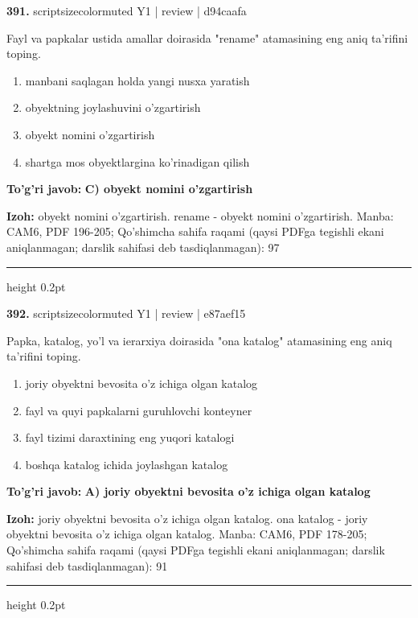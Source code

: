 \documentclass[10pt,a4paper]{article}
\begin{document}
{\bfseries\sffamily\color{ink} 391.} {scriptsizecolor{muted} Y1 | review | d94caafa}
\par
Fayl va papkalar ustida amallar doirasida "rename" atamasining eng aniq ta'rifini toping.
\begin{enumerate}[label=\Alph*),leftmargin=9mm]
\item manbani saqlagan holda yangi nusxa yaratish
\item obyektning joylashuvini o'zgartirish
\item obyekt nomini o'zgartirish
\item shartga mos obyektlargina ko'rinadigan qilish
\end{enumerate}
\begin{tcolorbox}[enhanced,breakable,colback=teal!4,colframe=teal!60!black,boxrule=0.45pt,arc=1.2mm,left=2.7mm,right=2.7mm,top=1.8mm,bottom=1.8mm,before skip=2mm,after skip=2mm]
{\bfseries\sffamily\color{teal}To'g'ri javob:} \textbf{C) obyekt nomini o'zgartirish}
\par\smallskip
{\bfseries Izoh:} obyekt nomini o'zgartirish. rename - obyekt nomini o'zgartirish. Manba: CAM6, PDF 196-205; Qo'shimcha sahifa raqami (qaysi PDFga tegishli ekani aniqlanmagan; darslik sahifasi deb tasdiqlanmagan): 97
\end{tcolorbox}
\vspace{2mm}\hrule height 0.2pt\vspace{3mm}

{\bfseries\sffamily\color{ink} 392.} {scriptsizecolor{muted} Y1 | review | e87aef15}
\par
Papka, katalog, yo'l va ierarxiya doirasida "ona katalog" atamasining eng aniq ta'rifini toping.
\begin{enumerate}[label=\Alph*),leftmargin=9mm]
\item joriy obyektni bevosita o'z ichiga olgan katalog
\item fayl va quyi papkalarni guruhlovchi konteyner
\item fayl tizimi daraxtining eng yuqori katalogi
\item boshqa katalog ichida joylashgan katalog
\end{enumerate}
\begin{tcolorbox}[enhanced,breakable,colback=teal!4,colframe=teal!60!black,boxrule=0.45pt,arc=1.2mm,left=2.7mm,right=2.7mm,top=1.8mm,bottom=1.8mm,before skip=2mm,after skip=2mm]
{\bfseries\sffamily\color{teal}To'g'ri javob:} \textbf{A) joriy obyektni bevosita o'z ichiga olgan katalog}
\par\smallskip
{\bfseries Izoh:} joriy obyektni bevosita o'z ichiga olgan katalog. ona katalog - joriy obyektni bevosita o'z ichiga olgan katalog. Manba: CAM6, PDF 178-205; Qo'shimcha sahifa raqami (qaysi PDFga tegishli ekani aniqlanmagan; darslik sahifasi deb tasdiqlanmagan): 91
\end{tcolorbox}
\vspace{2mm}\hrule height 0.2pt\vspace{3mm}
\end{document}
